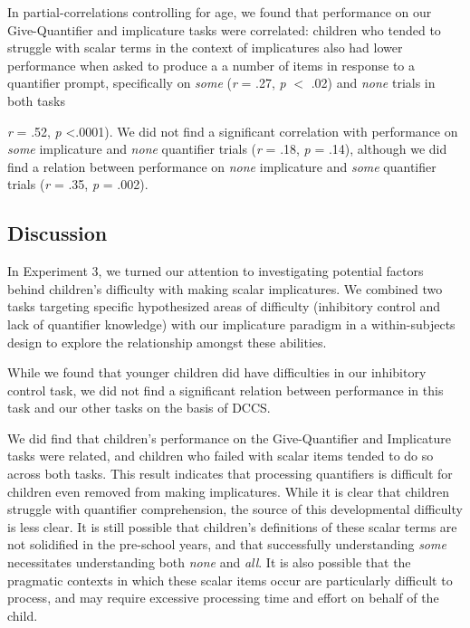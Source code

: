 \documentclass[man]{apa2}
\begin{document}
In partial-correlations controlling for age, we found that performance on our Give-Quantifier and implicature tasks were correlated: children who tended to struggle with scalar terms in the context of implicatures also had lower performance when asked to produce a a number of items in response to a quantifier prompt, specifically on \textit{some}  (\textit{r} = .27, \textit{p} $<$ .02) and \textit{none} trials in both tasks {\textit{r} = .52, \textit{p} \textless .0001). We did not find a significant correlation with performance on \textit{some} implicature and \textit{none} quantifier trials (\textit{r} = .18, \textit{p} = .14), although we did find a relation between performance on \textit{none} implicature and \textit{some} quantifier trials (\textit{r} = .35, \textit{p} = .002). 



\subsection{Discussion}

In Experiment 3, we turned our attention to investigating potential factors behind children's difficulty with making scalar implicatures. We combined two tasks targeting specific hypothesized areas of difficulty (inhibitory control and lack of quantifier knowledge) with our implicature paradigm in a within-subjects design to explore the relationship amongst these abilities. 

While we found that younger children did have difficulties in our inhibitory control task, we did not find a significant relation between performance in this task and our other tasks on the basis of DCCS. 

We did find that children's performance on the Give-Quantifier and Implicature tasks were related, and children who failed with scalar items tended to do so across both tasks. This result indicates that processing quantifiers is difficult for children even removed from making implicatures. While it is clear that children struggle with quantifier comprehension, the source of this developmental difficulty is less clear. It is still possible that children's definitions of these scalar terms are not solidified in the pre-school years, and that successfully understanding \textit{some} necessitates understanding both \textit{none} and \textit{all}. It is also possible that the pragmatic contexts in which these scalar items occur are particularly difficult to process, and may require excessive processing time and effort on behalf of the child. 

}
\end{document}
